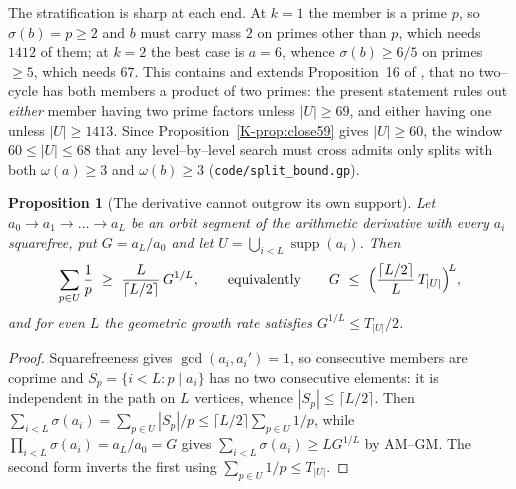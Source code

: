 \documentclass[11pt]{article}
\newtheorem{proposition}[theorem]{Proposition}
\theoremstyle{definition}
\begin{document}
The stratification is sharp at each end. At $k=1$ the member is a prime $p$, so $\sigma(b)=p\ge2$ and
$b$ must carry mass $2$ on primes other than $p$, which needs $1412$ of them; at $k=2$ the best case
is $a=6$, whence $\sigma(b)\ge6/5$ on primes $\ge5$, which needs $67$. This contains and extends
Proposition~16 of \cite{Kovic2012}, that no two--cycle has both members a product of two primes: the
present statement rules out \emph{either} member having two prime factors unless $|U|\ge69$, and
either having one unless $|U|\ge1413$. Since Proposition~\ref{K-prop:close59} gives $|U|\ge60$, the
window $60\le|U|\le68$ that any level--by--level search must cross admits only splits with both
$\omega(a)\ge3$ and $\omega(b)\ge3$ \textup{(\texttt{code/split\_bound.gp})}.

\begin{proposition}[The derivative cannot outgrow its own support]\label{prop:growth}
Let $a_0\to a_1\to\dots\to a_L$ be an orbit segment of the arithmetic derivative with every $a_i$
squarefree, put $G=a_L/a_0$ and let $U=\bigcup_{i<L}\operatorname{supp}(a_i)$. Then
\[ \sum_{p\in U}\frac1p\ \ge\ \frac{L}{\lceil L/2\rceil}\,G^{1/L},
\qquad\text{equivalently}\qquad
G\ \le\ \Bigl(\frac{\lceil L/2\rceil}{L}\,T_{|U|}\Bigr)^{\!L}, \]
and for even $L$ the geometric growth rate satisfies $G^{1/L}\le T_{|U|}/2$.
\end{proposition}
\begin{proof}
Squarefreeness gives $\gcd(a_i,a_i')=1$, so consecutive members are coprime and
$S_p=\{i<L:p\mid a_i\}$ has no two consecutive elements: it is independent in the path on $L$
vertices, whence $|S_p|\le\lceil L/2\rceil$. Then $\sum_{i<L}\sigma(a_i)=\sum_{p\in U}|S_p|/p\le
\lceil L/2\rceil\sum_{p\in U}1/p$, while $\prod_{i<L}\sigma(a_i)=a_L/a_0=G$ gives
$\sum_{i<L}\sigma(a_i)\ge LG^{1/L}$ by AM--GM. The second form inverts the first using
$\sum_{p\in U}1/p\le T_{|U|}$.
\end{proof}
\end{document}
